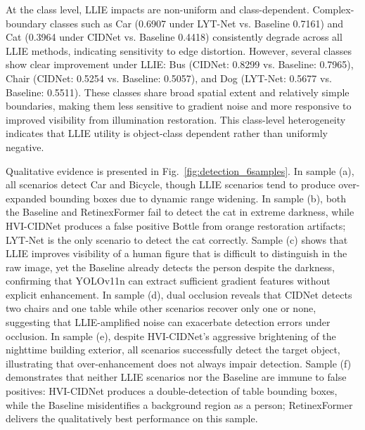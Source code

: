 \documentclass[conference]{IEEEtran}
\begin{document}
At the class level, LLIE impacts are non-uniform and class-dependent. Complex-boundary classes such as Car (0.6907 under LYT-Net vs. Baseline 0.7161) and Cat (0.3964 under CIDNet vs. Baseline 0.4418) consistently degrade across all LLIE methods, indicating sensitivity to edge distortion. However, several classes show clear improvement under LLIE: Bus (CIDNet: 0.8299 vs. Baseline: 0.7965), Chair (CIDNet: 0.5254 vs. Baseline: 0.5057), and Dog (LYT-Net: 0.5677 vs. Baseline: 0.5511). These classes share broad spatial extent and relatively simple boundaries, making them less sensitive to gradient noise and more responsive to improved visibility from illumination restoration. This class-level heterogeneity indicates that LLIE utility is object-class dependent rather than uniformly negative.

Qualitative evidence is presented in Fig.~\ref{fig:detection_6samples}. In sample (a), all scenarios detect Car and Bicycle, though LLIE scenarios tend to produce over-expanded bounding boxes due to dynamic range widening. In sample (b), both the Baseline and RetinexFormer fail to detect the cat in extreme darkness, while HVI-CIDNet produces a false positive Bottle from orange restoration artifacts; LYT-Net is the only scenario to detect the cat correctly. Sample (c) shows that LLIE improves visibility of a human figure that is difficult to distinguish in the raw image, yet the Baseline already detects the person despite the darkness, confirming that YOLOv11n can extract sufficient gradient features without explicit enhancement. In sample (d), dual occlusion reveals that CIDNet detects two chairs and one table while other scenarios recover only one or none, suggesting that LLIE-amplified noise can exacerbate detection errors under occlusion. In sample (e), despite HVI-CIDNet's aggressive brightening of the nighttime building exterior, all scenarios successfully detect the target object, illustrating that over-enhancement does not always impair detection. Sample (f) demonstrates that neither LLIE scenarios nor the Baseline are immune to false positives: HVI-CIDNet produces a double-detection of table bounding boxes, while the Baseline misidentifies a background region as a person; RetinexFormer delivers the qualitatively best performance on this sample.
\end{document}
